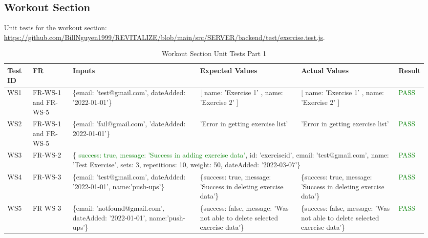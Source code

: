 \documentclass[12pt, titlepage]{article}
\begin{document}
\subsection{Workout Section}
\newpage

Unit tests for the workout section: \url{https://github.com/BillNguyen1999/REVITALIZE/blob/main/src/SERVER/backend/test/exercise.test.js}.
\begin{table}[h]
\centering
\small
\begin{tabularx}{\textwidth}{|X|X|p{3cm}|p{2.5cm}|p{2.5cm}|X|}
	\hline
	Test ID & FR & Inputs & Expected Values & Actual Values & Result \\
	\hline
	WS1 & FR-WS-1 and FR-WS-5 & \{email: 'test@gmail.com', dateAdded: '2022-01-01'\}  & [{ name: 'Exercise 1' }, { name: 'Exercise 2' }] & [{ name: 'Exercise 1' }, { name: 'Exercise 2' }] & \textcolor{Green}{PASS} \\
	\hline
	WS2 & FR-WS-1 and FR-WS-5 & \{email: 'fail@gmail.com', 'dateAdded: 2022-01-01'\}  & 'Error in getting exercise list' & 'Error in getting exercise list' & \textcolor{Green}{PASS} \\
	\hline
	WS3 & FR-WS-2 & \multicolumn{3}{p{8cm}|}{\centering \{ \textcolor{Green}{success: true, message: 'Success in adding exercise data'}, id: 'exerciseid', email: 'test@gmail.com', name: 'Test Exercise', sets: 3, repetitions: 10, weight: 50, dateAdded: '2022-03-07'\}}  &  \textcolor{Green}{PASS}\\
	\hline
	WS4 & FR-WS-3 & \{email: 'test@gmail.com', dateAdded: '2022-01-01', name:'push-ups'\}  & \{success: true, message: 'Success in deleting exercise data'\} & \{success: true, message: 'Success in deleting exercise data'\} & \textcolor{Green}{PASS} \\
	\hline
	WS5 & FR-WS-3 & \{email: 'notfound@gmail.com', dateAdded: '2022-01-01', name:'push-ups'\}  & \{success: false, message: 'Was not able to delete selected exercise data'\} & \{success: false, message: 'Was not able to delete selected exercise data'\} & \textcolor{Green}{PASS} \\
	\hline
\end{tabularx}
\caption{Workout Section Unit Tests Part 1}
\label{table:workout-unit-tests}
\end{table}

\newpage
\end{document}
